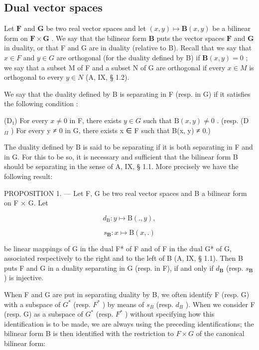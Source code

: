 \subsection{Dual vector spaces}

Let \(\mathbf{F}\) and \(\mathbf{G}\) be two real vector spaces and let \((x, y) \mapsto \mathbf{B}(x, y)\) be a bilinear form on \(\mathbf{F} \times \mathbf{G}\) . We say that the bilinear form \(\mathbf{B}\) puts the vector spaces \(\mathbf{F}\) and \(\mathbf{G}\) in duality, or that F and G are in duality (relative to B). Recall that we say that \(x \in F\) and \(y \in G\) are orthogonal (for the duality defined by B) if \(\mathbf{B}(x, y) = 0\) ; we say that a subset M of F and a subset N of G are orthogonal if every \(x \in M\) is orthogonal to every \(y \in N\) (A, IX, § 1.2).

We say that the duality defined by B is separating in F (resp. in G) if it satisfies the following condition :

(D₁) For every \(x \neq 0\) in F, there exists \(y \in G\) such that \(\mathrm{B}(x, y) \neq 0\) . (resp. (D \(_{II}\) ) For every y ≠ 0 in G, there exists x ∈ F such that B(x, y) ≠ 0.)

The duality defined by B is said to be separating if it is both separating in F and in G. For this to be so, it is necessary and sufficient that the bilinear form B should be separating in the sense of A, IX, § 1.1. More precisely we have the following result:

PROPOSITION 1. --- Let F, G be two real vector spaces and B a bilinear form on F × G. Let

\[
d _ {\mathrm{B}}: y \mapsto \mathrm{B} (., y),
\]

\[
s _ {\mathbf {B}} \colon x \mapsto \mathrm{B} (x,.)
\]

be linear mappings of G in the dual F* of F and of F in the dual G* of G, associated respectively to the right and to the left of B (A, IX, § 1.1). Then B puts F and G in a duality separating in G (resp. in F), if and only if \(d_{\mathbf{B}}\) (resp. \(s_{\mathbf{B}}\) ) is injective.

When F and G are put in separating duality by B, we often identify F (resp. G) with a subspace of \(G^{*}\) (resp. \(F^{*}\) ) by means of \(s_{B}\) (resp. \(d_{B}\) ). When we consider F (resp. G) as a subspace of \(G^{*}\) (resp. \(F^{*}\) ) without specifying how this identification is to be made, we are always using the preceding identifications; the bilinear form B is then identified with the restriction to \(F \times G\) of the canonical bilinear form:

